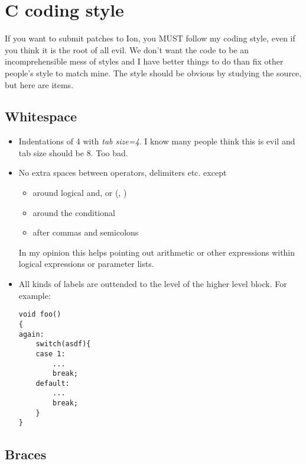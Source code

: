 \section{C coding style}

If you want to submit patches to Ion, you MUST follow my coding 
style, even if you think it is the root of all evil. We don't want
the code to be an incomprehensible mess of styles and I have better
things to do than fix other people's style to match mine. The style
should be obvious by studying the source, but here are items.

\subsection{Whitespace}

\begin{itemize}
  \item Indentations of 4 with \emph{tab size=4}. I know many people
    think this is evil and tab size should be 8. Too bad.
    
  \item No extra spaces between operators, delimiters etc. except
    \begin{itemize}
      \item around logical and, or (\code{&&}, \code{||})
      \item around the conditional 
      \item after commas and semicolons
    \end{itemize}  
    In my opinion this helps pointing out arithmetic or other
    expressions within logical expressions or parameter lists.
    
  \item All kinds of labels are outtended to the level of the higher
    level block. For example:

\begin{verbatim}    
void foo()
{
again:
    switch(asdf){
    case 1:
        ...
        break;
    default:
        ...
        break;
    }
}
\end{verbatim}
\end{itemize}

\subsection{Braces}

